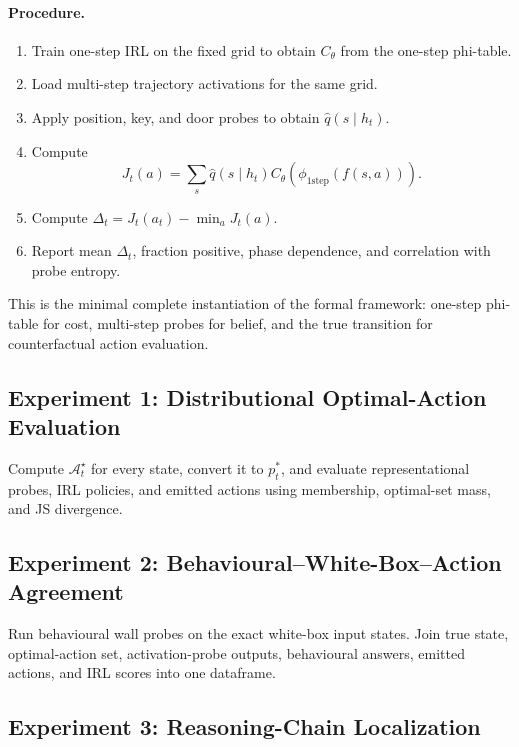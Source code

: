 \documentclass[11pt,a4paper]{article}
\newcommand{\qhat}{\hat q}
\newcommand{\optset}{\mathcal{A}^{\star}}
\begin{document}
\paragraph{Procedure.}
\begin{enumerate}[leftmargin=*]
\item Train one-step IRL on the fixed grid to obtain $C_\theta$ from the one-step phi-table.
\item Load multi-step trajectory activations for the same grid.
\item Apply position, key, and door probes to obtain $\qhat(s\mid h_t)$.
\item Compute
\[
J_t(a)=\sum_s\qhat(s\mid h_t) C_\theta(\phi_{\mathrm{1step}}(f(s,a))).
\]
\item Compute $\Delta_t=J_t(a_t)-\min_aJ_t(a)$.
\item Report mean $\Delta_t$, fraction positive, phase dependence, and correlation with probe entropy.
\end{enumerate}

\begin{insight}
This is the minimal complete instantiation of the formal framework: one-step phi-table for cost, multi-step probes for belief, and the true transition for counterfactual action evaluation.
\end{insight}

\subsection{Experiment 1: Distributional Optimal-Action Evaluation}

Compute $\optset_t$ for every state, convert it to $p_t^*$, and evaluate representational probes, IRL policies, and emitted actions using membership, optimal-set mass, and JS divergence.

\subsection{Experiment 2: Behavioural--White-Box--Action Agreement}

Run behavioural wall probes on the exact white-box input states. Join true state, optimal-action set, activation-probe outputs, behavioural answers, emitted actions, and IRL scores into one dataframe.

\subsection{Experiment 3: Reasoning-Chain Localization}
\end{document}
